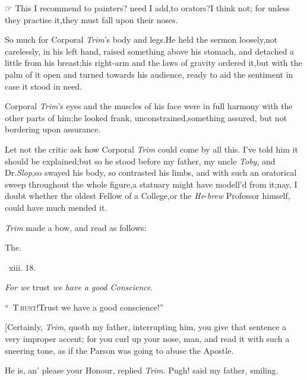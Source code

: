 \documentclass{article}
\begin{document}
☞ This I recommend to painters?\tsk\break
need I add,\tsk to orators?\tsk I think not;\break
for unless they practise it,\tsh they must\break
fall upon their noses.

So much for Corporal \textit{Trim}’s body and
legs.\tsk He held the sermon loosely,\tsk not carelessly, in
his left hand, raised something above his stomach, and detached a
little from his breast;\tsh his right-arm
\pb
and the laws of gravity ordered
it,\tsh but with the palm of it open and turned towards
his audience, ready to aid the sentiment in case it stood in
need.

Corporal \textit{Trim}’s eyes and the muscles of his face
were in full harmony with the other parts of him;\tsk he looked
frank,\tsk\break
unconstrained,\tsk something assured,\tsh\break
but not bordering upon assurance.

Let not the critic ask how Corporal \textit{Trim} could come by
all this. I’ve told him it should be explained;\tsk but so he
stood before my father, my uncle \textit{Toby}, and Dr.\@ \textit{Slop},\tsk so swayed his body, so contrasted his limbs, and
with such an oratorical sweep throughout the whole
figure,\tsh a statuary might have modell’d from
it;\tsh nay, I doubt whether the oldest Fellow of a
College,\tsk or the \textit{He}-\pb\textit{brew} Professor himself, could have
much mended it.

\textit{Trim} made a bow, and read as follows:

\bigskip
\centerline{The\quad {}.}
\bigskip
\centerline{\, xiii. 18.}
\tsh \textit{For we} trust \textit{we have a good
Conscience}.\tsh

\lettrine{\lower-12pt\hbox{\normalsize “ }T}{\,rust!}\tsh Trust we have a good conscience!”

[Certainly, \textit{Trim}, quoth my father, interrupting him, you
give that sentence a very improper accent; for you curl up your
nose, man, and read it with such a sneering tone, as if the Parson
was going to abuse the Apostle.

\newpage
He is, an’ please your Honour, replied \textit{Trim.} Pugh!
said my father, smiling.
\end{document}
